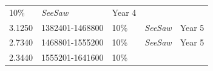 \documentclass[11pt,a4paperpaper,]{report}
\begin{document}
\begin{longtable}[]{@{}llllc@{}}
\begin{minipage}[t]{0.14\columnwidth}
10\%\strut
\end{minipage} & \begin{minipage}[t]{0.25\columnwidth}\raggedright\strut
\textit{SeeSaw}\strut
\end{minipage} & \begin{minipage}[t]{0.12\columnwidth}\centering\strut
Year 4\strut
\end{minipage}\tabularnewline
\begin{minipage}[t]{0.12\columnwidth}\raggedright\strut
3.1250\strut
\end{minipage} & \begin{minipage}[t]{0.19\columnwidth}\raggedright\strut
1382401-1468800\strut
\end{minipage} & \begin{minipage}[t]{0.14\columnwidth}\raggedright\strut
10\%\strut
\end{minipage} & \begin{minipage}[t]{0.25\columnwidth}\raggedright\strut
\textit{SeeSaw}\strut
\end{minipage} & \begin{minipage}[t]{0.12\columnwidth}\centering\strut
Year 5\strut
\end{minipage}\tabularnewline
\begin{minipage}[t]{0.12\columnwidth}\raggedright\strut
2.7340\strut
\end{minipage} & \begin{minipage}[t]{0.19\columnwidth}\raggedright\strut
1468801-1555200\strut
\end{minipage} & \begin{minipage}[t]{0.14\columnwidth}\raggedright\strut
10\%\strut
\end{minipage} & \begin{minipage}[t]{0.25\columnwidth}\raggedright\strut
\textit{SeeSaw}\strut
\end{minipage} & \begin{minipage}[t]{0.12\columnwidth}\centering\strut
Year 5\strut
\end{minipage}\tabularnewline
\begin{minipage}[t]{0.12\columnwidth}\raggedright\strut
2.3440\strut
\end{minipage} & \begin{minipage}[t]{0.19\columnwidth}\raggedright\strut
1555201-1641600\strut
\end{minipage} & \begin{minipage}[t]{0.14\columnwidth}\raggedright\strut
10\%\strut
\end{minipage} & \begin{minipage}[t]{0.25\columnwidth}\raggedright\strut

\end{minipage}
\end{longtable}
\end{document}
